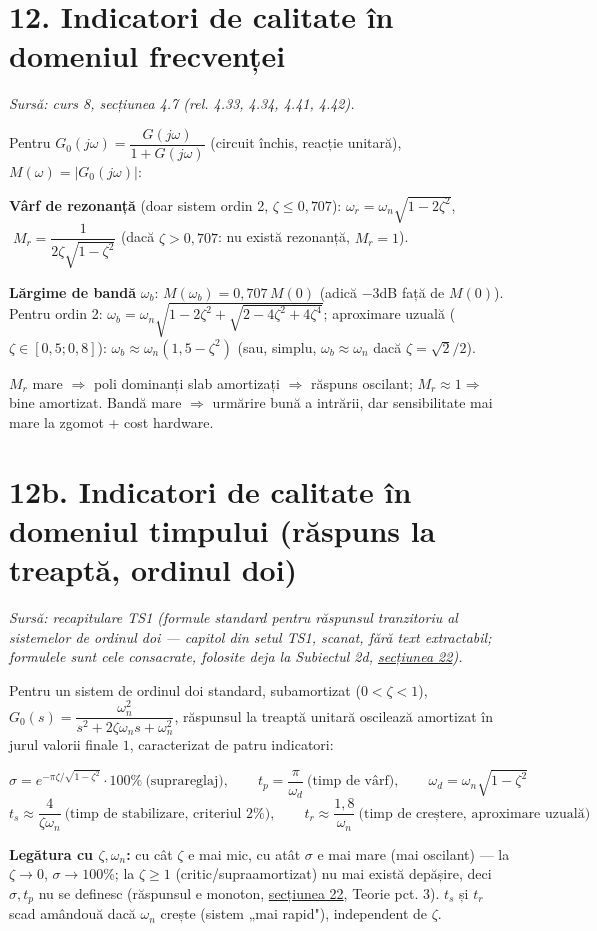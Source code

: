 \documentclass[10pt,a4paper]{article}
\newcommand{\srcnote}[1]{{\footnotesize\color{gray!55!black}\textit{Sursă: #1}}\par}
\begin{document}
\section*{12. Indicatori de calitate în domeniul frecvenței}\label{sec:12}
\srcnote{curs 8, secțiunea 4.7 (rel. 4.33, 4.34, 4.41, 4.42).}
Pentru $G_0(j\omega)=\dfrac{G(j\omega)}{1+G(j\omega)}$ (circuit închis, reacție unitară), $M(\omega)=|G_0(j\omega)|$:
\begin{keyeq}\color{red!65!black}
\textbf{Vârf de rezonanță} (doar sistem ordin 2, $\zeta\le0{,}707$): $\omega_r=\omega_n\sqrt{1-2\zeta^2}$, $\;M_r=\dfrac{1}{2\zeta\sqrt{1-\zeta^2}}$ (dacă $\zeta>0{,}707$: nu există rezonanță, $M_r=1$).

\textbf{Lărgime de bandă} $\omega_b$: $M(\omega_b)=0{,}707\,M(0)$ (adică $-3$dB față de $M(0)$). Pentru ordin 2: $\omega_b=\omega_n\sqrt{1-2\zeta^2+\sqrt{2-4\zeta^2+4\zeta^4}}$; aproximare uzuală ($\zeta\in[0{,}5;0{,}8]$): $\omega_b\approx\omega_n(1{,}5-\zeta^2)$ (sau, simplu, $\omega_b\approx\omega_n$ dacă $\zeta=\sqrt2/2$).
\end{keyeq}
$M_r$ mare $\Rightarrow$ poli dominanți slab amortizați $\Rightarrow$ răspuns oscilant; $M_r\approx1\Rightarrow$ bine amortizat. Bandă mare $\Rightarrow$ urmărire bună a intrării, dar sensibilitate mai mare la zgomot + cost hardware.

\section*{12b. Indicatori de calitate în domeniul timpului (răspuns la treaptă, ordinul doi)}\label{sec:12b}
\srcnote{recapitulare TS1 (formule standard pentru răspunsul tranzitoriu al sistemelor de ordinul doi — capitol din setul TS1, scanat, fără text extractabil; formulele sunt cele consacrate, folosite deja la Subiectul 2d, \hyperref[sec:22]{secțiunea 22}).}
Pentru un sistem de ordinul doi standard, subamortizat ($0{<}\zeta{<}1$), $G_0(s)=\dfrac{\omega_n^2}{s^2+2\zeta\omega_ns+\omega_n^2}$, răspunsul la treaptă unitară oscilează amortizat în jurul valorii finale $1$, caracterizat de patru indicatori:
\begin{keyeq}\color{red!65!black}
$$\sigma=e^{-\pi\zeta/\sqrt{1-\zeta^2}}\cdot100\%\ \text{(suprareglaj)},\qquad t_p=\dfrac\pi{\omega_d}\ \text{(timp de vârf)},\qquad \omega_d=\omega_n\sqrt{1-\zeta^2}$$
$$t_s\approx\dfrac4{\zeta\omega_n}\ \text{(timp de stabilizare, criteriul 2\%)},\qquad t_r\approx\dfrac{1{,}8}{\omega_n}\ \text{(timp de creștere, aproximare uzuală)}$$
\end{keyeq}
\textbf{Legătura cu $\zeta,\omega_n$:} cu cât $\zeta$ e mai mic, cu atât $\sigma$ e mai mare (mai oscilant) — la $\zeta{\to}0$, $\sigma{\to}100\%$; la $\zeta{\ge}1$ (critic/supraamortizat) nu mai există depășire, deci $\sigma,t_p$ nu se definesc (răspunsul e monoton, \hyperref[sec:22]{secțiunea 22}, Teorie pct. 3). $t_s$ și $t_r$ scad amândouă dacă $\omega_n$ crește (sistem „mai rapid"), independent de $\zeta$.
\end{document}
